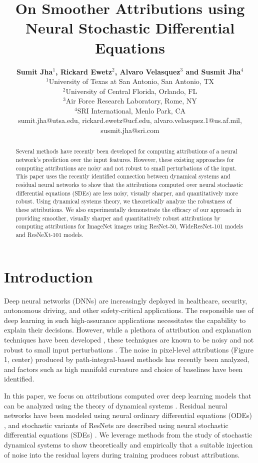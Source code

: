\documentclass[10pt,twocolumn]{article}
\title{ \textbf{On Smoother Attributions using Neural Stochastic Differential Equations} }
\author{
\textbf{Sumit Jha$^1$, Rickard Ewetz$^2$, Alvaro Velasquez$^3$ and Susmit Jha$^4$ } \\
$^1$University of Texas at San Antonio, San Antonio, TX \\
$^2$University of Central Florida, Orlando, FL \\
$^3$Air Force Research Laboratory, Rome, NY \\
$^4$SRI International, Menlo Park, CA \\
sumit.jha@utsa.edu, rickard.ewetz@ucf.edu, alvaro.velasquez.1@us.af.mil, susmit.jha@sri.com
}
\date{}
\begin{document}
\maketitle
\thispagestyle{firstpage}  %

\begin{abstract}
Several methods have recently been developed for computing attributions of a neural network's prediction over the input features. However, these existing approaches for computing attributions are noisy and not robust to small perturbations of the input. This paper uses the recently identified connection between dynamical systems and residual neural networks to show that the attributions computed over neural stochastic differential equations (SDEs) are less noisy, visually sharper, and quantitatively more robust. Using dynamical systems theory, we theoretically analyze the robustness of these attributions. We also experimentally demonstrate the efficacy of our approach in providing smoother, visually sharper and quantitatively robust attributions by computing attributions for ImageNet images using ResNet-50, WideResNet-101 models and ResNeXt-101 models.
\end{abstract}


\section{Introduction}
Deep neural networks (DNNs) are increasingly deployed in healthcare, security, autonomous driving, and other safety-critical applications. The responsible use of deep learning in such high-assurance applications necessitates the capability to explain their decisions. However, while a plethora of attribution and explanation techniques have been developed \cite{adebayo2018sanity}, these techniques are known to be noisy and not robust to small input perturbations \cite{adebayo2018sanity}. The noise in pixel-level attributions (Figure 1, center) produced by path-integral-based methods \cite{adebayo2018sanity} has recently been analyzed, and factors such as high manifold curvature and choice of baselines have been identified.

In this paper, we focus on attributions computed over deep learning models that can be analyzed using the theory of dynamical systems \cite{adebayo2018sanity}. Residual neural networks have been modeled using neural ordinary differential equations (ODEs) \cite{adebayo2018sanity}, and stochastic variants of ResNets are described using neural stochastic differential equations (SDEs) \cite{adebayo2018sanity}. We leverage methods from the study of stochastic dynamical systems to show theoretically and empirically that a suitable injection of noise into the residual layers during training produces robust attributions.
\end{document}
